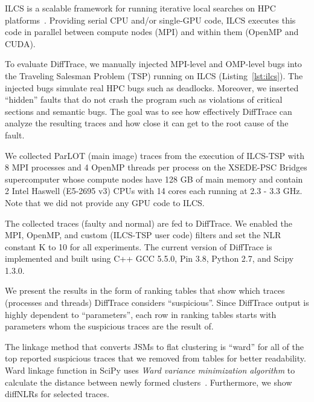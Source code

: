 ILCS is a scalable framework for running iterative local searches on HPC platforms~\cite{ilcs}.
%
Providing serial CPU and/or single-GPU code, ILCS executes this code in parallel between compute nodes (MPI) and within them (OpenMP and CUDA).
%

To evaluate DiffTrace, we manually injected MPI-level and OMP-level bugs into the Traveling Salesman Problem (TSP) running on ILCS (Listing~\ref{lst:ilcs}).
%
The injected bugs simulate real HPC bugs such as deadlocks.
%
%
Moreover, we inserted ``hidden'' faults that do not crash the program such as violations of critical sections and semantic bugs.
%
%
The goal was to see how effectively DiffTrace can analyze the resulting traces and how close it can get to the root cause of the fault.
%


%
We collected ParLOT (main image) traces from the execution of ILCS-TSP with 8 MPI processes and 4 OpenMP threads per process on the XSEDE-PSC Bridges supercomputer whose compute nodes have 128 GB of main memory and contain 2 Intel Haswell (E5-2695 v3) CPUs with 14 cores each running at 2.3 - 3.3 GHz.
%
Note that we did not provide any GPU code to ILCS.
%

The collected traces (faulty and normal) are fed to DiffTrace. We enabled the MPI, OpenMP, and custom (ILCS-TSP user code) filters and set the NLR constant K to 10 for all experiments.
%
The current version of DiffTrace is implemented and built using C++ GCC 5.5.0, Pin 3.8, Python 2.7, and Scipy 1.3.0.

%
We present the results in the form of ranking tables that show which traces (processes and threads) DiffTrace considers ``suspicious''. Since DiffTrace output is highly dependent to ``parameters'', each row in ranking tables starts with parameters whom the suspicious traces are the result of.

The linkage method that converts JSMs to flat clustering is ``ward'' for all of the top reported suspicious traces that we removed from tables for better readability. Ward linkage function in SciPy uses \textit{Ward variance minimization algorithm} to calculate the distance between newly formed clusters~\cite{scipy}. Furthermore, we show diffNLRs for selected traces.



